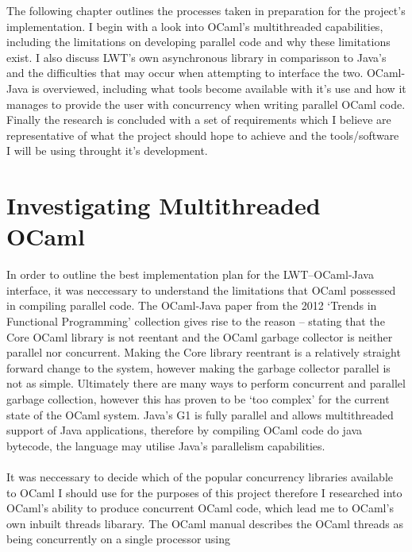 \documentclass[12pt,twoside,notitlepage]{report}
\begin{document}
%
%
The following chapter outlines the processes taken in preparation for the project's implementation. I begin with a look into OCaml's multithreaded capabilities, including the limitations on developing parallel code and why these
limitations exist. I also discuss LWT's own asynchronous library in comparisson to Java's and the difficulties that may occur when attempting to interface the two. OCaml-Java is overviewed, including what tools become available with
it's use and how it manages to provide the user with concurrency when writing parallel OCaml code. Finally the research is concluded with a set of requirements which I believe are representative of what the project should hope to
achieve and the tools/software I will be using throught it's development.

\section{Investigating Multithreaded OCaml}
\label{sec:investigating_multithreaded_ocaml}
%
%
In order to outline the best implementation plan for the LWT--OCaml-Java interface, it was neccessary to understand the limitations that OCaml possessed in compiling parallel code. The OCaml-Java paper from the 2012 `Trends in
Functional Programming' collection\cite{clerc2012} gives rise to the reason -- stating that the Core OCaml library is not reentant and the OCaml garbage collector is neither parallel nor concurrent. Making the Core library reentrant
is a relatively straight forward change to the system, however making the garbage collector parallel is not as simple. Ultimately there are many ways to perform concurrent and parallel garbage collection, however this has proven to be
`too complex' for the current state of the OCaml system. Java's G1 is fully parallel and allows multithreaded support of Java applications, therefore by compiling OCaml code
do java bytecode, the language may utilise Java's parallelism capabilities.
\\
\\
%
%
It was neccessary to decide which of the popular concurrency libraries available to OCaml I should use for the purposes of this project therefore I researched into OCaml's ability to produce concurrent OCaml code, which lead me to
OCaml's own inbuilt threads libarary. The OCaml manual\cite{leroy2013} describes the OCaml threads as being concurrently on a single processor using
\end{document}
